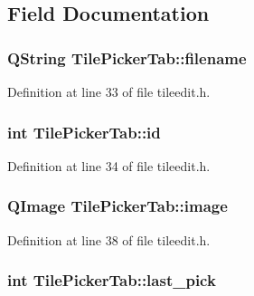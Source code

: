 \subsection{Field Documentation}
\hypertarget{classTilePickerTab_a56a5255e678287a8229b4fc488309567}{
\subsubsection[{filename}]{\setlength{\rightskip}{0pt plus 5cm}Q\+String Tile\+Picker\+Tab\+::filename\hspace{0.3cm}{\ttfamily [private]}}}\label{classTilePickerTab_a56a5255e678287a8229b4fc488309567}


Definition at line 33 of file tileedit.\+h.

\hypertarget{classTilePickerTab_ab8494dd5699dc9f7e6851db4101f2087}{
\subsubsection[{id}]{\setlength{\rightskip}{0pt plus 5cm}int Tile\+Picker\+Tab\+::id\hspace{0.3cm}{\ttfamily [private]}}}\label{classTilePickerTab_ab8494dd5699dc9f7e6851db4101f2087}


Definition at line 34 of file tileedit.\+h.

\hypertarget{classTilePickerTab_ac443b8ad8b35aaa27d855a3513268358}{
\subsubsection[{image}]{\setlength{\rightskip}{0pt plus 5cm}Q\+Image Tile\+Picker\+Tab\+::image\hspace{0.3cm}{\ttfamily [private]}}}\label{classTilePickerTab_ac443b8ad8b35aaa27d855a3513268358}


Definition at line 38 of file tileedit.\+h.

\hypertarget{classTilePickerTab_a0ecc501d1b669df84fdeeb37500ce95e}{
\subsubsection[{last\+\_\+pick}]{\setlength{\rightskip}{0pt plus 5cm}int Tile\+Picker\+Tab\+::last\+\_\+pick\hspace{0.3cm}{\ttfamily [private]}}}\label{classTilePickerTab_a0ecc501d1b669df84fdeeb37500ce95e}



